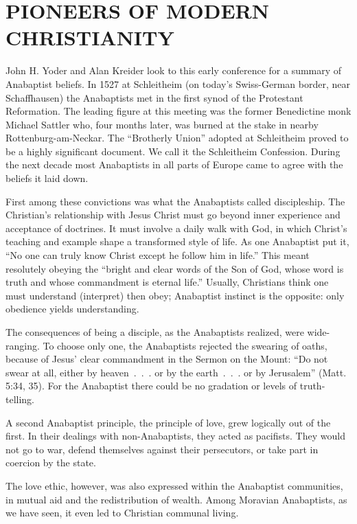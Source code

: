 \section{PIONEERS OF MODERN CHRISTIANITY}

John H. Yoder and Alan Kreider look to this early conference for a summary of Anabaptist beliefs. In
1527 at Schleitheim (on today’s Swiss-German border, near Schaffhausen) the Anabaptists met in the
first synod of the Protestant Reformation. The leading figure at this meeting was the former
Benedictine monk Michael Sattler who, four months later, was burned at the stake in nearby
Rottenburg-am-Neckar. The “Brotherly Union” adopted at Schleitheim proved to be a highly significant
document. We call it the Schleitheim Confession. During the next decade most Anabaptists in all
parts of Europe came to agree with the beliefs it laid down.

First among these convictions was what the Anabaptists called discipleship. The Christian’s
relationship with Jesus Christ must go beyond inner experience and acceptance of doctrines. It must
involve a daily walk with God, in which Christ’s teaching and example shape a transformed style of
life. As one Anabaptist put it, “No one can truly know Christ except he follow him in life.” This
meant resolutely obeying the “bright and clear words of the Son of God, whose word is truth and
whose commandment is eternal life.” Usually, Christians think one must understand (interpret) then
obey; Anabaptist instinct is the opposite: only obedience yields understanding.

The consequences of being a disciple, as the Anabaptists realized, were wide-ranging. To choose only
one, the Anabaptists rejected the swearing of oaths, because of Jesus’ clear commandment in the
Sermon on the Mount: “Do not swear at all, either by heaven~.~.~. or by the earth~.~.~. or by
Jerusalem” (Matt. 5:34, 35). For the Anabaptist there could be no gradation or levels of
truth-telling.

A second Anabaptist principle, the principle of love, grew logically out of the first. In their
dealings with non-Anabaptists, they acted as pacifists. They would not go to war, defend themselves
against their persecutors, or take part in coercion by the state.

The love ethic, however, was also expressed within the Anabaptist communities, in mutual aid and the
redistribution of wealth. Among Moravian Anabaptists, as we have seen, it even led to Christian
communal living.

